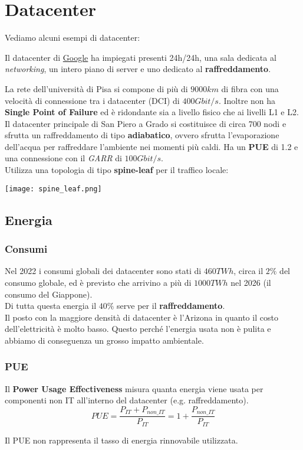 \newpage
\section{Datacenter}
Vediamo alcuni esempi di datacenter:
\begin{example}[Google]
	Il datacenter di \hyperref{https://www.youtube.com/watch?v=avP5d16wEp0&list=LLe8YQrC8Io0iIj1IsacdJRA}{}{}{Google} ha impiegati presenti 24h/24h, una sala dedicata al \textit{networking}, un intero piano di server e uno dedicato al \textbf{raffreddamento}.
\end{example}
\begin{example}[UniPi]
	La rete dell'università di Pisa si compone di più di $9000km$ di fibra con una velocità di connessione tra i datacenter (DCI) di $400 Gbit/s$. Inoltre non ha \textbf{Single Point of Failure} ed è ridondante sia a livello fisico che ai livelli L1 e L2.\\
	Il datacenter principale di San Piero a Grado si costituisce di circa 700 nodi e sfrutta un raffreddamento di tipo \textbf{adiabatico}, ovvero sfrutta l'evaporazione dell'acqua per raffreddare l'ambiente nei momenti più caldi. Ha un \textbf{PUE} di 1.2 e una connessione con il \textit{GARR} di $100Gbit/s$.\\
	Utilizza una topologia di tipo \textbf{spine-leaf} per il traffico locale:
	\begin{center}
		\texttt{[image: spine\_leaf.png]}
	\end{center}
\end{example}

\subsection{Energia}
\subsubsection{Consumi}
Nel 2022 i consumi globali dei datacenter sono stati di $460TWh$, circa il $2\%$ del consumo globale, ed è previsto che arrivino a più di $1000TWh$ nel 2026 (il consumo del Giappone).\\
Di tutta questa energia il $40\%$ serve per il \textbf{raffreddamento}.\\
Il posto con la maggiore densità di datacenter è l'Arizona in quanto il costo dell'elettricità è molto basso. Questo perché l'energia usata non è pulita e abbiamo di conseguenza un grosso impatto ambientale.
\subsubsection{PUE}
Il \textbf{Power Usage Effectiveness} misura quanta energia viene usata per componenti non IT all'interno del datacenter (e.g. raffreddamento).
\begin{equation}
	PUE=\frac{P_{IT}+P_{non\_IT}}{P_{IT}} = 1 + \frac{P_{non\_IT}}{P_{IT}}
\end{equation}
\begin{note}
	Il PUE non rappresenta il tasso di energia rinnovabile utilizzata.
\end{note}
